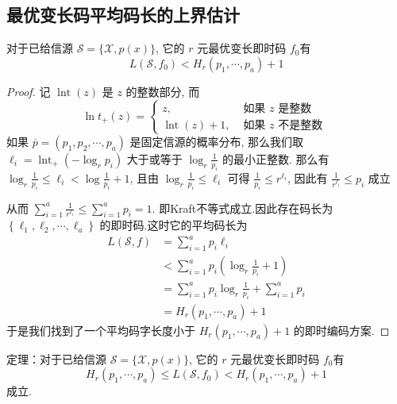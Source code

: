 \subsection{ 最优变长码平均码长的上界估计}
\begin{theorem}
    对于已给信源 $ \mathscr{S}=\{\mathscr{X}, p(x)\} $, 它的 $ r $ 元最优变长即时码 $ f_{0} $有
$$
L\left(\mathscr{S}, f_{0}\right)<H_{r}\left(p_{1}, \cdots, p_{a}\right)+1
$$
\end{theorem}
\begin{proof}
    记 $ \operatorname{lnt}(z) $ 是 $ z $ 的整数部分, 而
$$
\ln t_{+}(z)=\left\{\begin{array}{ll}
z, & \text { 如果 } z \text { 是整数 } \\
\operatorname{lnt}(z)+1, & \text { 如果 } z \text { 不是整数 }
\end{array}\right.
$$
如果 $ \overline{p}=\left(p_{1}, p_{2}, \cdots, p_{a}\right) $ 是固定信源的概率分布, 那么我们取 $ \ell_{i}=\operatorname{lnt}_{+}\left(-\log _{r} p_{i}\right) $ 大于或等于 $ \log _{r} \frac{1}{p_{i}} $ 的最小正整数. 那么有 $ \log _{r} \frac{1}{p_{i}} \leq \ell_{i}<\log \frac{1}{p_{i}}+1 $, 且由 $ \log _{r} \frac{1}{p_{i}} \leq \ell_{i} $ 可得 $ \frac{1}{p_{i}} \leq r^{\ell_{i}} $, 因此有 $ \frac{1}{r^{\ell_{i}}} \leq p_{i} $ 成立

从而 $ \sum\limits_{i=1}^{a} \frac{1}{r^{\ell_{i}}} \leq \sum\limits_{i=1}^{a} p_{i}=1 $.
即Kraft不等式成立.因此存在码长为 $ \left\{\ell_{1}, \ell_{2}, \cdots, \ell_{a}\right\} $ 的即时码.这时它的平均码长为
$$
\begin{aligned}
L(\mathscr{S}, f) & =\sum_{i=1}^{a} p_{i} \ell_{i} \\
& <\sum_{i=1}^{a} p_{i}\left(\log _{r} \frac{1}{p_{i}}+1\right) \\
& =\sum_{i=1}^{a} p_{i} \log _{r} \frac{1}{p_{i}}+\sum_{i=1}^{a} p_{i} \\
& =H_{r}\left(p_{1}, \cdots, p_{a}\right)+1
\end{aligned}
$$
于是我们找到了一个平均码字长度小于 $ H_{r}\left(p_{1}, \cdots, p_{a}\right)+1 $ 的即时编码方案.

\end{proof}

\begin{theorem}
    定理：对于已给信源 $ \mathscr{S}=\{\mathscr{X}, p(x)\} $, 它的 $ r $ 元最优变长即时码 $ f_{0} $有
$$
H_{r}\left(p_{1}, \cdots, p_{a}\right) \leq L\left(\mathscr{S}, f_{0}\right)<H_{r}\left(p_{1}, \cdots, p_{a}\right)+1
$$
成立.
\end{theorem}









